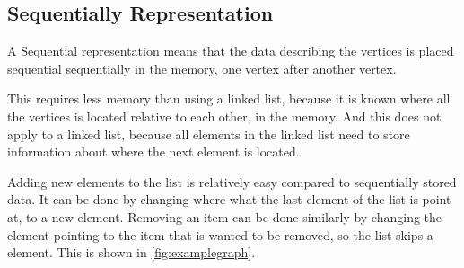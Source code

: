 \subsection{Sequentially Representation}
A Sequential representation means that the data describing the vertices is placed sequential sequentially in the memory, one vertex after another vertex. 

This requires less memory than using a linked list, because it is known where all the vertices is located relative to each other, in the memory. And this does not apply to a linked list, because all elements in the linked list need to store information about where the next element is located.

Adding new elements to the list is relatively easy compared to sequentially stored data.
It can be done by changing where what the last element of the list is point at, to a new element.
Removing an item can be done similarly by changing the element pointing to the item that is wanted to be removed, so the list skips a element. This is shown in \cref{fig:examplegraph}. %







